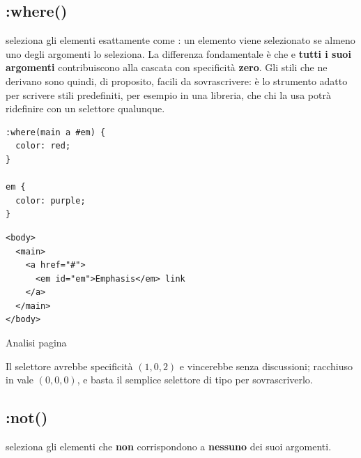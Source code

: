 \subsection{:where()}

 seleziona gli elementi esattamente come : un
elemento viene selezionato se almeno uno degli argomenti lo seleziona. La
differenza fondamentale è che  e \textbf{tutti i suoi argomenti}
contribuiscono alla cascata con specificità \textbf{zero}. Gli stili che ne
derivano sono quindi, di proposito, facili da sovrascrivere: è lo strumento
adatto per scrivere stili predefiniti, per esempio in una libreria, che chi la
usa potrà ridefinire con un selettore qualunque.

\begin{affianco}[0.44][c]
\begin{lstlisting}[style=css, name=where.css]
:where(main a #em) {
  color: red;
}

em {
  color: purple;
}
\end{lstlisting}
\begin{lstlisting}[style=html, name=where.html]
<body>
  <main>
    <a href="#">
      <em id="em">Emphasis</em> link
    </a>
  </main>
</body>
\end{lstlisting}
\risultato
\begin{browser}
\end{browser}
\begin{devtools}{Analisi pagina}
  \dtchiudi
  \dtchiudi
\end{devtools}
\end{affianco}

Il selettore  avrebbe specificità $(1, 0, 2)$ e vincerebbe
senza discussioni; racchiuso in  vale $(0, 0, 0)$, e basta il
semplice selettore di tipo  per sovrascriverlo.

\subsection{:not()}

 seleziona gli elementi che \textbf{non} corrispondono a
\textbf{nessuno} dei suoi argomenti.


